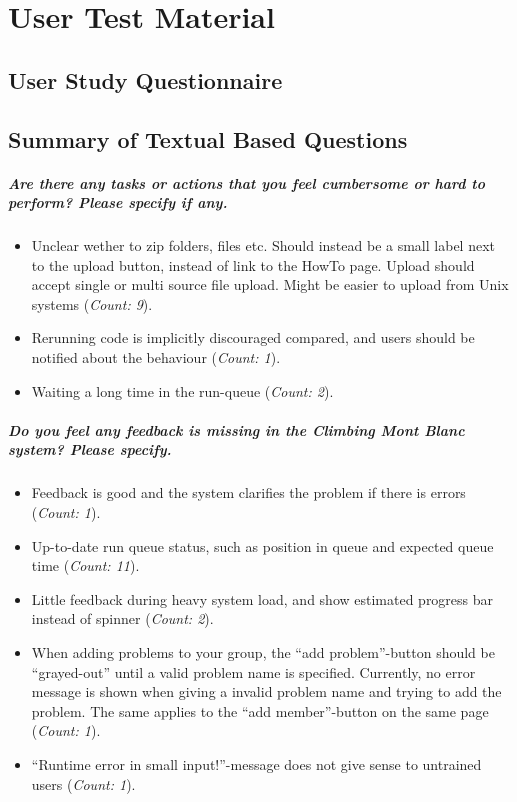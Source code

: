 \chapter{User Test Material}
\label{apdx:usertest}

\section{User Study Questionnaire}


\section{Summary of Textual Based Questions}
\paragraph*{Are there any tasks or actions that you feel cumbersome or hard to perform? Please specify if any.} \hfill 
\begin{itemize}
  \item Unclear wether to zip folders, files etc. Should instead be a small label next to the upload button, instead of link to the HowTo page. Upload should accept single or multi source file upload. Might be easier to upload from Unix systems (\textit{Count: 9}).
  \item Rerunning code is implicitly discouraged compared, and users should be notified about the behaviour (\textit{Count: 1}).
  \item Waiting a long time in the run-queue (\textit{Count: 2}).
\end{itemize}

\paragraph*{Do you feel any feedback is missing in the Climbing Mont Blanc system? Please specify.} \hfill
\begin{itemize}
  \item Feedback is good and the system clarifies the problem if there is errors (\textit{Count: 1}).
  \item Up-to-date run queue status, such as position in queue and expected queue time (\textit{Count: 11}).
  \item Little feedback during heavy system load, and show estimated progress bar instead of spinner (\textit{Count: 2}).
  \item When adding problems to your group, the ``add problem''-button should be ``grayed-out'' until a valid problem name is specified. Currently, no error message is shown when giving a invalid problem name and trying to add the problem. The same applies to the ``add member''-button on the same page (\textit{Count: 1}).
  \item ``Runtime error in small input!''-message does not give sense to untrained users (\textit{Count: 1}).
\end{itemize}

